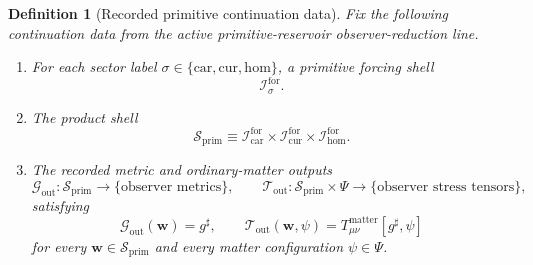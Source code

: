 \documentclass[11pt]{article}
\newcommand{\CompletedMetric}{g^{\sharp}}
\newcommand{\MatterSpace}{\Psi}
\newcommand{\Car}{\mathrm{car}}
\newcommand{\Cur}{\mathrm{cur}}
\newcommand{\Hom}{\mathrm{hom}}
\newcommand{\ForSpace}[1]{\mathcal I_{#1}^{\mathrm{for}}}
\newcommand{\PrimShell}{\mathcal S_{\mathrm{prim}}}
\newcommand{\MetricOut}{\mathscr G_{\mathrm{out}}}
\newcommand{\MatterOut}{\mathscr T_{\mathrm{out}}}
\newtheorem{definition}{Definition}
\begin{document}
\begin{definition}[Recorded primitive continuation data]
\label{def:fixed}
Fix the following continuation data from the active primitive-reservoir observer-reduction line.
\begin{enumerate}
    \item For each sector label \(\sigma\in\{\Car,\Cur,\Hom\}\), a primitive forcing shell
    \[
    \ForSpace{\sigma}.
    \]
    \item The product shell
    \[
    \PrimShell
    \equiv
    \ForSpace{\Car}\times \ForSpace{\Cur}\times \ForSpace{\Hom}.
    \]
    \item The recorded metric and ordinary-matter outputs
    \[
    \MetricOut:\PrimShell\to\{\text{observer metrics}\},
    \qquad
    \MatterOut:\PrimShell\times\MatterSpace\to\{\text{observer stress tensors}\},
    \]
    satisfying
    \begin{equation}
    \MetricOut(\mathbf w)=\CompletedMetric,
    \qquad
    \MatterOut(\mathbf w,\psi)
    =
    T_{\mu\nu}^{\mathrm{matter}}[\CompletedMetric,\psi]
    \label{eq:fixedoutputs}
    \end{equation}
    for every \(\mathbf w\in\PrimShell\) and every matter configuration \(\psi\in\MatterSpace\).
\end{enumerate}
\end{definition}
\end{document}
